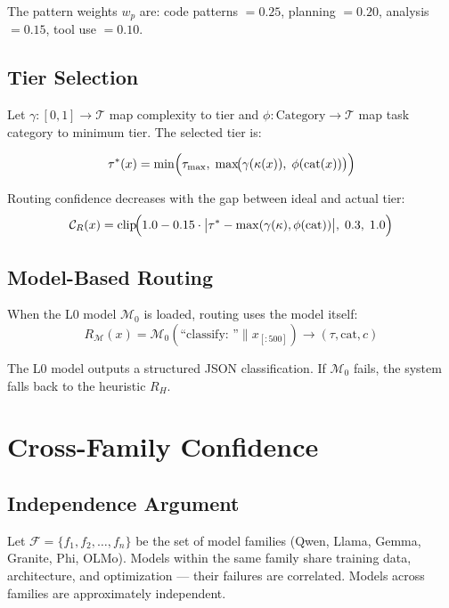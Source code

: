 \documentclass[11pt, a4paper, twocolumn]{article}
\newcommand{\conf}{\mathcal{C}}
\newcommand{\family}{\mathcal{F}}
\newcommand{\model}{\mathcal{M}}
\begin{document}
The pattern weights $w_p$ are: code patterns $= 0.25$, planning $= 0.20$, analysis $= 0.15$, tool use $= 0.10$.

\subsection{Tier Selection}

Let $\gamma: [0,1] \to \mathcal{T}$ map complexity to tier and $\phi: \text{Category} \to \mathcal{T}$ map task category to minimum tier. The selected tier is:

\begin{equation}
    \tau^*(x) = \min\Bigl(\tau_{\max},\; \max\!\bigl(\gamma(\kappa(x)),\; \phi(\text{cat}(x))\bigr)\Bigr)
\end{equation}

Routing confidence decreases with the gap between ideal and actual tier:
\begin{equation}
    \conf_R(x) = \text{clip}\!\Bigl(1.0 - 0.15 \cdot \bigl|\tau^* - \max(\gamma(\kappa), \phi(\text{cat}))\bigr|,\; 0.3,\; 1.0\Bigr)
\end{equation}

\subsection{Model-Based Routing}

When the L0 model $\model_0$ is loaded, routing uses the model itself:
\begin{equation}
    R_{\model}(x) = \model_0\!\left(\text{``classify: ''} \| x_{[:500]}\right) \to (\tau, \text{cat}, c)
\end{equation}

The L0 model outputs a structured JSON classification. If $\model_0$ fails, the system falls back to the heuristic $R_H$.

\section{Cross-Family Confidence}

\subsection{Independence Argument}

Let $\family = \{f_1, f_2, \ldots, f_n\}$ be the set of model families (Qwen, Llama, Gemma, Granite, Phi, OLMo). Models within the same family share training data, architecture, and optimization --- their failures are correlated. Models across families are approximately independent.
\end{document}
